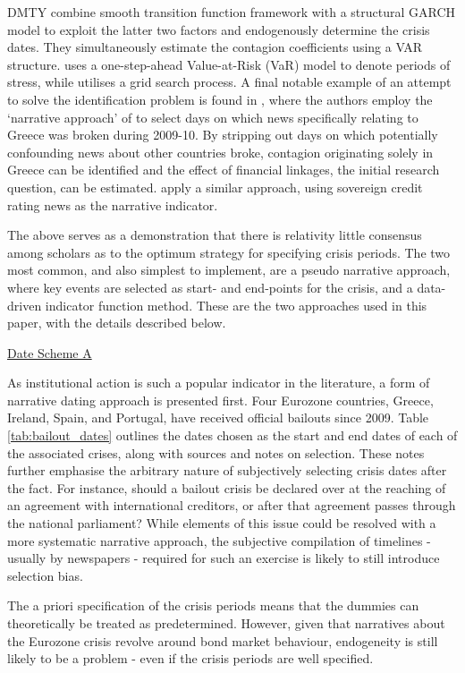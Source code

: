 \documentclass[../base.tex]{subfiles}
\begin{document}
DMTY combine smooth transition function framework with a structural GARCH model to exploit the latter two factors and endogenously determine the crisis dates. They simultaneously estimate the contagion coefficients using a VAR structure. \cite{metiu2012sovereign} uses a one-step-ahead Value-at-Risk (VaR) model to denote periods of stress, while \cite{massacci2007identification} utilises a grid search process. A final notable example of an attempt to solve the identification problem is found in \cite{brutti2012transmission}, where the authors employ the `narrative approach' of \cite{romer1989does} to select days on which news specifically relating to Greece was broken during 2009-10. By stripping out days on which potentially confounding news about other countries broke, contagion originating solely in Greece can be identified and the effect of financial linkages, the initial research question, can be estimated. \cite{arezki2011sovereign} apply a similar approach, using sovereign credit rating news as the narrative indicator. 

The above serves as a demonstration that there is relativity little consensus among scholars as to the optimum strategy for specifying crisis periods. The two most common, and also simplest to implement, are a pseudo narrative approach, where key events are selected as start- and end-points for the crisis, and a data-driven indicator function method. These are the two approaches used in this paper, with the details described below.

\underline{Date Scheme A}

As institutional action is such a popular indicator in the literature, a form of narrative dating approach is presented first. Four Eurozone countries, Greece, Ireland, Spain, and Portugal, have received official bailouts since 2009. Table \ref{tab:bailout_dates} outlines the dates chosen as the start and end dates of each of the associated crises, along with sources and notes on selection. These notes further emphasise the arbitrary nature of subjectively selecting crisis dates after the fact. For instance, should a bailout crisis be declared over at the reaching of an agreement with international creditors, or after that agreement passes through the national parliament? While elements of this issue could be resolved with a more systematic narrative approach, the subjective compilation of timelines - usually by newspapers - required for such an exercise is likely to still introduce selection bias. 

The a priori specification of the crisis periods means that the dummies can theoretically be treated as predetermined. However, given that narratives about the Eurozone crisis revolve around bond market behaviour, endogeneity is still likely to be a problem - even if the crisis periods are well specified.
\end{document}
